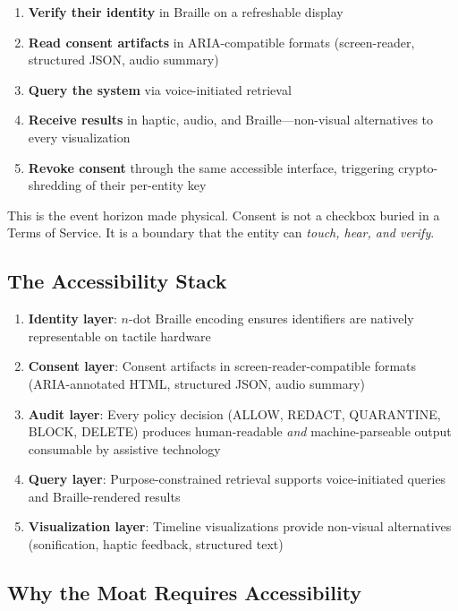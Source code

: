 \documentclass[11pt,twocolumn]{article}
\begin{document}
\begin{enumerate}[nosep,leftmargin=1.5em]
  \item \textbf{Verify their identity} in Braille on a refreshable display
  \item \textbf{Read consent artifacts} in ARIA-compatible formats (screen-reader, structured JSON, audio summary)
  \item \textbf{Query the system} via voice-initiated retrieval
  \item \textbf{Receive results} in haptic, audio, and Braille---non-visual alternatives to every visualization
  \item \textbf{Revoke consent} through the same accessible interface, triggering crypto-shredding of their per-entity key
\end{enumerate}

This is the event horizon made physical. Consent is not a checkbox buried in a Terms of Service. It is a boundary that the entity can \emph{touch, hear, and verify}.

\subsection{The Accessibility Stack}
\label{sec:accessibility}

\begin{enumerate}[nosep,leftmargin=1.5em]
  \item \textbf{Identity layer}: $n$-dot Braille encoding ensures identifiers are natively representable on tactile hardware
  \item \textbf{Consent layer}: Consent artifacts in screen-reader-compatible formats (ARIA-annotated HTML, structured JSON, audio summary)
  \item \textbf{Audit layer}: Every policy decision (ALLOW, REDACT, QUARANTINE, BLOCK, DELETE) produces human-readable \emph{and} machine-parseable output consumable by assistive technology
  \item \textbf{Query layer}: Purpose-constrained retrieval supports voice-initiated queries and Braille-rendered results
  \item \textbf{Visualization layer}: Timeline visualizations provide non-visual alternatives (sonification, haptic feedback, structured text)
\end{enumerate}

\subsection{Why the Moat Requires Accessibility}
\end{document}

